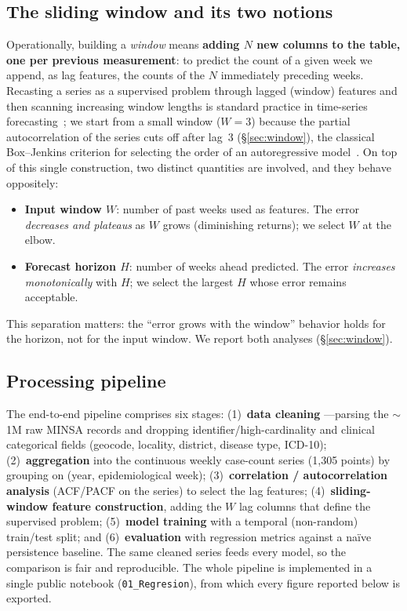 \documentclass[runningheads]{llncs}
\begin{document}
\subsection{The sliding window and its two notions}
Operationally, building a \emph{window} means \textbf{adding $N$ new columns to the
table, one per previous measurement}: to predict the count of a given week we append, as
lag features, the counts of the $N$ immediately preceding weeks. Recasting a series as a
supervised problem through lagged (window) features and then scanning increasing window
lengths is standard practice in time-series forecasting~\cite{hyndmanFPP,boxjenkins}; we
start from a small window ($W=3$) because the partial autocorrelation of the series cuts
off after lag~3 (\S\ref{sec:window}), the classical Box--Jenkins criterion for selecting
the order of an autoregressive model~\cite{boxjenkins}. On top of this single
construction, two distinct quantities are involved, and they behave oppositely:
\begin{itemize}\itemsep1pt
  \item \textbf{Input window $W$}: number of past weeks used as features. The error
  \emph{decreases and plateaus} as $W$ grows (diminishing returns); we select $W$ at the
  elbow.
  \item \textbf{Forecast horizon $H$}: number of weeks ahead predicted. The error
  \emph{increases monotonically} with $H$; we select the largest $H$ whose error remains
  acceptable.
\end{itemize}
This separation matters: the ``error grows with the window'' behavior holds for the
horizon, not for the input window. We report both analyses (\S\ref{sec:window}).

\subsection{Processing pipeline}
The end-to-end pipeline comprises six stages: (1)~\textbf{data cleaning} ---parsing the
$\sim$1M raw MINSA records and dropping identifier/high-cardinality and clinical categorical
fields (geocode, locality, district, disease type, ICD-10); (2)~\textbf{aggregation} into
the continuous weekly case-count series (1{,}305 points) by grouping on (year,
epidemiological week); (3)~\textbf{correlation / autocorrelation analysis} (ACF/PACF on the
series) to select the lag features; (4)~\textbf{sliding-window feature construction}, adding
the $W$ lag columns that define the supervised problem; (5)~\textbf{model training} with a
temporal (non-random) train/test split; and (6)~\textbf{evaluation} with regression metrics
against a na\"ive persistence baseline. The same cleaned series feeds every model, so the
comparison is fair and reproducible. The whole pipeline is implemented in a single public
notebook (\texttt{01\_Regresion}), from which every figure reported below is exported.
\end{document}
